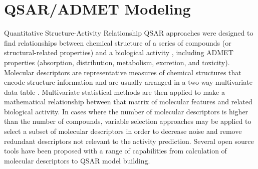 \section{QSAR/ADMET Modeling}
  
Quantitative Structure-Activity Relationship QSAR approaches were designed to find relationships between chemical structure of a series of compounds (or structural-related properties) and a biological activity \cite{1995}, including ADMET properties (absorption, distribution, metabolism, excretion, and toxicity). Molecular descriptors are representative measures of chemical structures that encode structure information and are usually arranged in a two-way multivariate data table \cite{Consonni_2009}. Multivariate statistical methods are then applied to make a mathematical relationship between that matrix of molecular features and related biological activity. In cases where the number of molecular descriptors is higher than the number of compounds, variable selection approaches may be applied to select a subset of molecular descriptors in order to decrease noise and remove redundant descriptors not relevant to the activity prediction. Several open source tools have been proposed with a range of capabilities from calculation of molecular descriptors to QSAR model building. 